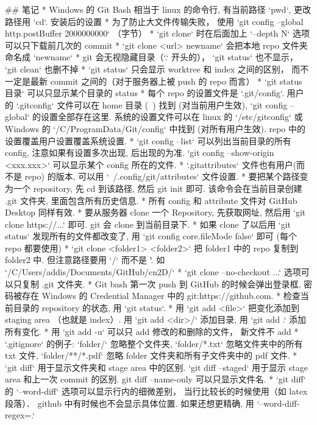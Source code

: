 ## 笔记
* Windows 的 Git Bash 相当于 linux 的命令行, 有当前路径 `pwd`, 更改路径用 `cd`.
安装后的设置
* 为了防止大文件传输失败， 使用 `git config --global http.postBuffer 2000000000` （字节）
* `git clone` 时在后面加上 `--depth N` 选项可以只下载前几次的 commit
* `git clone <url> newname` 会把本地 repo 文件夹命名成 `newname`
* git 会无视隐藏目录（`.` 开头的）， `git status` 也不显示， `git clean` 也删不掉
* `git status` 只会显示 worktree 和 index 之间的区别， 而不一定是最新 commit 之间的（对于服务器上被 push 的 repo 而言）
* `git status 目录` 可以只显示某个目录的 status
* 每个 repo 的设置文件是 `.git/config`. 用户的 `.gitconfig` 文件可以在 home 目录 (~) 找到 (对当前用户生效), `git config --global` 的设置全部存在这里. 系统的设置文件可以在 linux 的 `/etc/gitconfig` 或 Windows 的 `/C/ProgramData/Git/config` 中找到 (对所有用户生效). repo 中的设置覆盖用户设置覆盖系统设置.
* `git config --list` 可以列出当前目录的所有 config, 注意如果有设置多次出现, 后出现的为准. `git config --show-origin <xxx.xxx>` 可以显示某个 config 所在的文件.
* `.gitattributes` 文件也有用户(而不是 repo) 的版本, 可以用 `~/.config/git/attributes` 文件设置.
* 要把某个路径变为一个 repository, 先 cd 到该路径, 然后 git init 即可. 该命令会在当前目录创建 .git 文件夹, 里面包含所有历史信息.
* 所有 config 和 attribute 文件对 GitHub Desktop 同样有效.
* 要从服务器 clone 一个 Repository, 先获取网址, 然后用 `git clone https://...` 即可. git 会 clone 到当前目录下.
* 如果 clone 了以后用 `git status` 发现所有的文件都改变了, 用 `git config core.fileMode false` 即可 (每个 repo 都要使用)
* `git clone <folder1> <folder2>` 把 folder1 中的 repo 复制到 folder2 中. 但注意路径要用 `/` 而不是 `\`. 如 `/C/Users/addis/Documents/GitHub/cn2D/`
* `git clone --no-checkout ...` 选项可以只复制 .git 文件夹.
* Git bash 第一次 push 到 GitHub 的时候会弹出登录框, 密码被存在 Windows 的 Credential Manager 中的 git:https://github.com.
* 检查当前目录的 repository 的状态, 用 `git status`. 
* 用 `git add <file>` 把变化添加到 staging area （也就是 index）. 用 `git add <dir>/` 添加目录, 用 `git add .` 添加所有变化.
* 用 `git add -u` 可以只 add 修改的和删除的文件， 新文件不 add
* `.gitignore` 的例子: `folder/` 忽略整个文件夹, `folder/*.txt` 忽略文件夹中的所有 txt 文件, `folder/**/*.pdf` 忽略 folder 文件夹和所有子文件夹中的 pdf 文件.
* `git diff` 用于显示文件夹和 stage area 中的区别. `git diff --staged` 用于显示 stage area 和上一次 commit 的区别. git diff --name-only  可以只显示文件名.
* `git diff` 的 `--word-diff` 选项可以显示行内的细微差别， 当行比较长的时候使用（如 latex 段落）． github 中有时候也不会显示具体位置. 如果还想更精确, 用 `--word-diff-regex=.`
